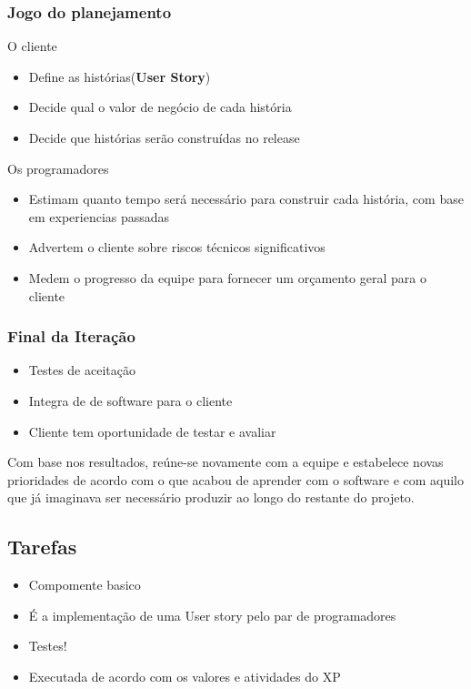 \documentclass[10pt]{beamer}
\begin{document}
\begin{frame}
  \frametitle{Jogo do planejamento}
    \begin{block}{O cliente}
      \begin{itemize}%
        \item Define as histórias(\textbf{User Story})
        \item Decide qual o valor de negócio de cada história
        \item Decide que histórias serão construídas no release
      \end{itemize}
    \end{block}
    \pause
    \begin{block}{Os programadores}
      \begin{itemize}%
        \item Estimam quanto tempo será necessário para construir cada história, com base em experiencias passadas
        \item Advertem o cliente sobre riscos técnicos significativos
        \item Medem o progresso da equipe para fornecer um orçamento geral para o cliente
      \end{itemize}
    \end{block}
\end{frame}


\begin{frame}
  \frametitle{Final da Iteração}
  \begin{itemize}%
    \item Testes de aceitação
    \item Integra de de software para o cliente
    \item Cliente tem oportunidade de testar e avaliar
  \end{itemize}
  \begin{block}{}
Com base nos resultados, reúne-se novamente com a equipe e estabelece novas prioridades de acordo com o que acabou de aprender com o software e com aquilo que já imaginava ser necessário produzir ao longo do restante do projeto.
  \end{block}
\end{frame}



\subsection{Tarefas}
\begin{frame}
  \begin{itemize}
  \item Compomente basico
  \item É a implementação de uma User story pelo par de programadores
  \item Testes!
  \item Executada de acordo com os valores e atividades do XP
  \end{itemize}
\end{frame}
\end{document}
